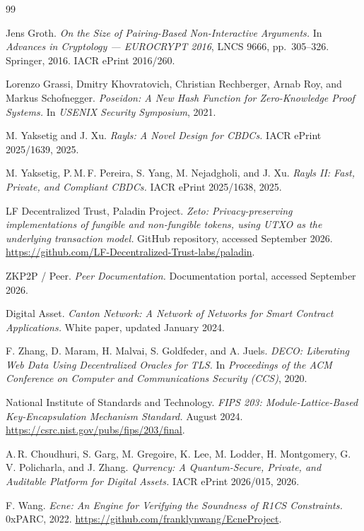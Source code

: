 \documentclass[10pt,twocolumn]{article}
\begin{document}
\begingroup
\footnotesize
\setlength{\itemsep}{0pt}
\begin{thebibliography}{99}

 Jens Groth. \emph{On the Size of Pairing-Based
Non-Interactive Arguments.} In \emph{Advances in Cryptology ---
EUROCRYPT 2016}, LNCS 9666, pp.\ 305--326. Springer, 2016. IACR ePrint
2016/260.

 Lorenzo Grassi, Dmitry Khovratovich, Christian
Rechberger, Arnab Roy, and Markus Schofnegger. \emph{Poseidon: A New
Hash Function for Zero-Knowledge Proof Systems.} In \emph{USENIX
Security Symposium}, 2021.

 M. Yaksetig and J. Xu. \emph{Rayls: A Novel Design for
CBDCs.} IACR ePrint 2025/1639, 2025.

 M. Yaksetig, P.\,M.\,F. Pereira, S. Yang, M. Nejadgholi,
and J. Xu. \emph{Rayls II: Fast, Private, and Compliant CBDCs.} IACR
ePrint 2025/1638, 2025.

 LF Decentralized Trust, Paladin Project. \emph{Zeto:
Privacy-preserving implementations of fungible and non-fungible tokens,
using UTXO as the underlying transaction model.} GitHub repository,
accessed September 2026.
\url{https://github.com/LF-Decentralized-Trust-labs/paladin}.

 ZKP2P / Peer. \emph{Peer Documentation.} Documentation
portal, accessed September 2026.

 Digital Asset. \emph{Canton Network: A Network of
Networks for Smart Contract Applications.} White paper, updated January
2024.

 F. Zhang, D. Maram, H. Malvai, S. Goldfeder, and A.
Juels. \emph{DECO: Liberating Web Data Using Decentralized Oracles for
TLS.} In \emph{Proceedings of the ACM Conference on Computer and
Communications Security (CCS)}, 2020.

 National Institute of Standards and Technology.
\emph{FIPS 203: Module-Lattice-Based Key-Encapsulation Mechanism
Standard.} August 2024.
\url{https://csrc.nist.gov/pubs/fips/203/final}.

 A.\,R. Choudhuri, S. Garg, M. Gregoire, K. Lee, M.
Lodder, H. Montgomery, G.\,V. Policharla, and J. Zhang. \emph{Qurrency: A
Quantum-Secure, Private, and Auditable Platform for Digital Assets.}
IACR ePrint 2026/015, 2026.

 F. Wang. \emph{Ecne: An Engine for Verifying the
Soundness of R1CS Constraints.} 0xPARC, 2022.
\url{https://github.com/franklynwang/EcneProject}.


\end{thebibliography}
\end{document}
